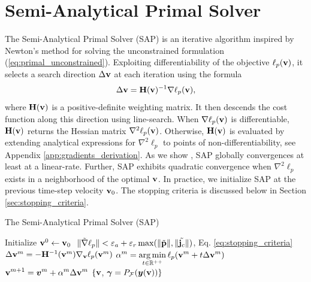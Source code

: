 

\section{Semi-Analytical Primal Solver}
\label{sec:sap_solver}

The Semi-Analytical Primal Solver (SAP) is an iterative algorithm inspired
by Newton's method for solving the unconstrained  formulation (\ref{eq:primal_unconstrained}). Exploiting differentiability of the objective
$\ell_p({\mathbf{v}})$, it selects a search direction $\Delta{\mathbf{v}}$ at each iteration using the
formula
\[
  \Delta{\mathbf{v}} =  {\mathbf{H}}({\mathbf{v}})^{-1} \nabla \ell_p({\mathbf{v}}),
\]
where ${\mathbf{H}}({\mathbf{v}})$ is a positive-definite weighting
matrix. It then descends the cost function along this direction
using line-search.  When $\nabla \ell_p({\mathbf{v}})$ is differentiable,
${\mathbf{H}}({\mathbf{v}})$ returns the Hessian matrix $\nabla^2 \ell_p({\mathbf{v}})$.
Otherwise, ${\mathbf{H}}({\mathbf{v}})$ is evaluated by extending
analytical expressions for $\nabla^2 \ell_p$ to points
of non-differentiability, see Appendix \ref{app:gradients_derivation}.  As we show , SAP 
globally convergences at least at a linear-rate.
Further, SAP exhibits quadratic convergence when
$\nabla^2 \ell_p$ exists in a neighborhood of the
optimal ${\mathbf{v}}$.
In practice, we initialize SAP at the previous time-step velocity ${\mathbf{v}}_0$.
The stopping criteria is discussed below in Section
\ref{sec:stopping_criteria}.

\begin{algorithm}[H]
  \caption{The Semi-Analytical Primal Solver (SAP)}	
	\label{alg:sap}
	\begin{algorithmic}[1]
		\State Initialize ${\mathbf{v}}^0 \gets {\mathbf{v}}_0$
		\RepeatUntil $~\Vert\tilde{\nabla}\ell_p\Vert < \varepsilon_a + \varepsilon_r\max(\Vert\tilde{{\mathbf{p}}}\Vert,\Vert\tilde{{\mathbf{j}}_c}\Vert)$, Eq. \eqref{eq:stopping_criteria}
			\State $\Delta{\mathbf{v}}^{m} = -{\mathbf{H}}^{-1}({\mathbf{v}}^m)\nabla_{\mathbf{v}}\ell_p({\mathbf{v}}^m)$ \label{op:Newton_iteration}
			\State $\displaystyle \alpha^m = \operatorname*{arg\,min}_{t\in\mathbb{R}^{++}} \ell_p({\mathbf{v}}^m + t \Delta{\mathbf{v}}^{m})$
			\State $\displaystyle {\mathbf{v}}^{m+1} = {\bm{v}}^m + \alpha^{m}\Delta{\mathbf{v}}^{m}$
		\EndRepeatUntil
		\State\Return $\{{\mathbf{v}}$, ${\bm\gamma}=P_\mathcal{F}({\bm{y}}({\mathbf{v}}))\}$
	\end{algorithmic}
\end{algorithm}

